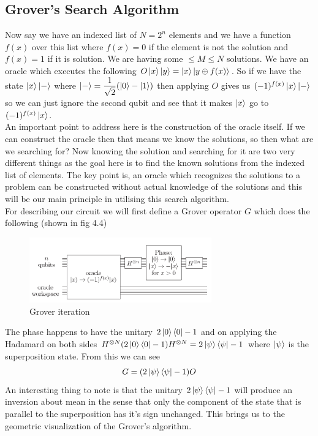 \documentclass{report}
\begin{document}
\subsection{Grover's Search Algorithm}
Now say we have an indexed list of $N = 2^{n}$ elements and we have a function $f(x)$ over this list where $f(x) = 0$ if the element is not the solution and $f(x) = 1$ if it is solution. We are having some $\leq M \leq N$ solutions. We have an oracle which executes the following $O\ket{x}\ket{y} = \ket{x}\ket{y \oplus f(x)}$. So if we have the state $\ket{x}\ket{-}$ where $\ket{-} = \dfrac{1}{\sqrt{2}}(\ket{0} - \ket{1})$ then applying $O$ gives us $(-1)^{f(x)}\ket{x}\ket{-}$ so we can just ignore the second qubit and see that it makes $\ket{x}$ go to $(-1)^{f(x)}\ket{x}$.\\
An important point to address here is the construction of the oracle itself. If we can construct the oracle then that means we know the solutions, so then what are we searching for? Now knowing the solution and searching for it are two very different things as the goal here is to find the known solutions from the indexed list of elements. The key point is, an oracle which recognizes the solutions to a problem can be constructed without actual knowledge of the solutions and this will be our main principle in utilising this search algorithm.\\
For describing our circuit we will first define a Grover operator $G$ which does the following (shown in fig 4.4)
\begin{figure}[ht]
    \centering
    \includegraphics[width = 0.7\textwidth]{images/grover iteration.png}
    \caption{Grover iteration}
\end{figure}
The phase happens to have the unitary $2\ket{0}\bra{0} - 1$ and on applying the Hadamard on both sides $H^{\otimes N}(2\ket{0}\bra{0}-1)H^{\otimes N} = 2\ket{\psi}\bra{\psi}-1$ where $\ket{\psi}$ is the superposition state. From this we can see
$$G = (2\ket{\psi}\bra{\psi} - 1)O$$
An interesting thing to note is that the unitary $2\ket{\psi}\bra{\psi} - 1$ will produce an inversion about mean in the sense that only the component of the state that is parallel to the superposition has it's sign unchanged. This brings us to the geometric visualization of the Grover's algorithm.\\
\end{document}

